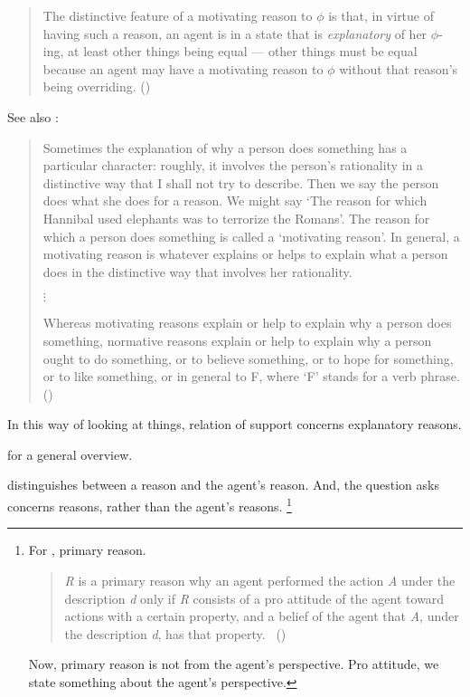 \begin{note}
{    \begin{quote}
      The distinctive feature of a motivating reason to \(\phi\) is that, in virtue of having such a reason, an agent is in a state that is \emph{explanatory} of her \(\phi\)-ing, at least other things being equal --- other things must be equal because an agent may have a motivating reason to \(\phi\) without that reason's being overriding.%
      \mbox{}\hfill\mbox{(\citeyear{Smith:1994wo})}
    \end{quote}

    See also \citeauthor{Broome:2013aa}:
    \begin{quote}
      Sometimes the explanation of why a person does something has a particular character:
      roughly, it involves the person's rationality in a distinctive way that I shall not try to describe.
      Then we say the person does what she does for a reason.
      We might say ‘The reason for which Hannibal used elephants was to terrorize the Romans'.
      The reason for which a person does something is called a ‘motivating reason'.
      In general, a motivating reason is whatever explains or helps to explain what a person does in the distinctive way that involves her rationality.

      \mbox{}\hfill\(\vdots\)\hfill\mbox{}

      Whereas motivating reasons explain or help to explain why a person does something, normative reasons explain or help to explain why a person ought to do something, or to believe something, or to hope for something, or to like something, or in general to F, where ‘F' stands for a verb phrase.%
      \mbox{}\hfill\mbox{(\citeyear[46--47]{Broome:2013aa})}
    \end{quote}

    In this way of looking at things, relation of support concerns explanatory reasons.

    \textcite{Hieronymi:2011aa} for a general overview.
  }
  \citeauthor{Davidson:1963aa} distinguishes between a reason and the agent's reason.
  And, the question \citeauthor{Davidson:1963aa} asks concerns reasons, rather than the agent's reasons.%
  \footnote{
    For \citeauthor{Davidson:1963aa}, primary reason.

    \begin{quote}
      \emph{R} is a primary reason why an agent performed the action \emph{A} under the description \emph{d} only if \emph{R} consists of a pro attitude of the agent toward actions with a certain property, and a belief of the agent that \emph{A}, under the description \emph{d}, has that property.\newline
      \mbox{ }\hfill\mbox{(\citeyear[687]{Davidson:1963aa})}
    \end{quote}
    Now, primary reason is not from the agent's perspective.
    Pro attitude, we state something about the agent's perspective.
  }


\end{note}
